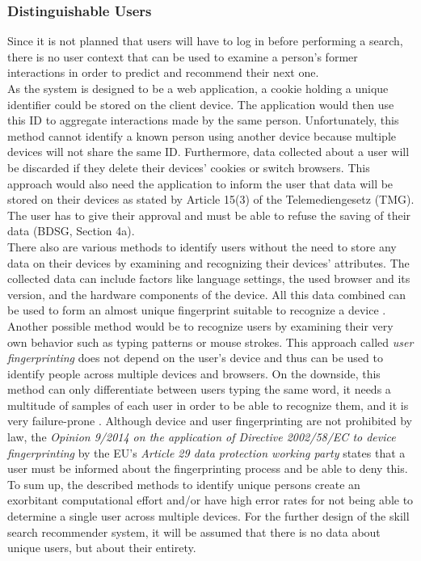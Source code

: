 \subsubsection{Distinguishable Users}
Since it is not planned that users will have to log in before performing a search,
there is no user context that can be used to examine a person's former interactions
in order to predict and recommend their next one.\\
As the system is designed to be a web application, a cookie holding a unique identifier could be stored on the client device. The application would then use this ID to aggregate interactions made by the same person. Unfortunately, this method cannot identify a known person using another device because multiple devices will not share the same ID. Furthermore, data collected about a user will be discarded if they delete their devices' cookies or switch browsers.
This approach would also need the application to inform the user that data will be stored on their devices as stated by Article 15(3) of the Telemediengesetz (TMG). The user has to give their approval and must be able to refuse the saving of their data (BDSG, Section 4a).\\
There also are various methods to identify users without the need to store any data on their devices by examining and recognizing their devices' attributes. The collected data can include
factors like language settings, the used browser and its version, and the hardware components of the device. All this data combined can be used to form an almost unique fingerprint suitable to recognize a device \cite{finger}.\\
Another possible method would be to recognize users by examining their very own behavior such as typing patterns or mouse strokes. This approach called \textit{user fingerprinting} does not depend on the user's device and thus can be used to identify people across multiple devices and browsers. On the downside, this method can only differentiate between users typing the same word, it needs a multitude of samples of each user in order to be able to recognize them, and it is very failure-prone \cite{typing}.
Although device and user fingerprinting are not prohibited by law,
the \textit{Opinion 9/2014 on the application of Directive 2002/58/EC to device
fingerprinting} by the EU's \textit{Article 29 data protection working party} states that a user must be informed about the fingerprinting process and be able to deny this.
To sum up, the described methods to identify unique persons create an exorbitant computational effort and/or have high error rates for not being able to determine a single user across multiple devices. For the further design of the skill search recommender system, it will be assumed that there is no data about unique users, but about their entirety.

